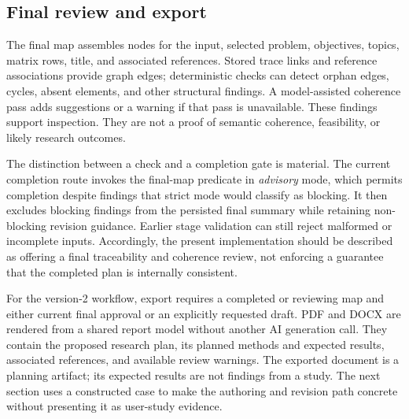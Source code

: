 \subsection{Final review and export}

The final map assembles nodes for the input, selected problem, objectives, topics, matrix rows, title, and associated references. Stored trace links and reference associations provide graph edges; deterministic checks can detect orphan edges, cycles, absent elements, and other structural findings. A model-assisted coherence pass adds suggestions or a warning if that pass is unavailable. These findings support inspection. They are not a proof of semantic coherence, feasibility, or likely research outcomes.

The distinction between a check and a completion gate is material. The current completion route invokes the final-map predicate in \emph{advisory} mode, which permits completion despite findings that strict mode would classify as blocking. It then excludes blocking findings from the persisted final summary while retaining non-blocking revision guidance. Earlier stage validation can still reject malformed or incomplete inputs. Accordingly, the present implementation should be described as offering a final traceability and coherence review, not enforcing a guarantee that the completed plan is internally consistent.

For the version-2 workflow, export requires a completed or reviewing map and either current final approval or an explicitly requested draft. PDF and DOCX are rendered from a shared report model without another AI generation call. They contain the proposed research plan, its planned methods and expected results, associated references, and available review warnings. The exported document is a planning artifact; its expected results are not findings from a study. The next section uses a constructed case to make the authoring and revision path concrete without presenting it as user-study evidence.
